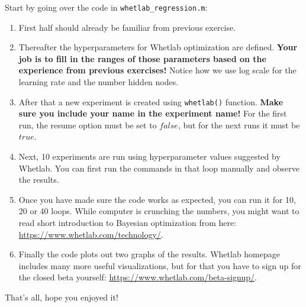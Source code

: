 \documentclass[a4paper,11pt]{article}
\begin{document}
 Start by going over the code in \texttt{whetlab\_regression.m}:

\begin{enumerate}
	\item First half should already be familiar from previous exercise.
	\item Thereafter the hyperparameters for Whetlab optimization are defined. \textbf{Your job is to fill in the ranges of those parameters based on the experience from previous exercises!} Notice how we use log scale for the learning rate and the number hidden nodes.
	\item After that a new experiment is created using \texttt{whetlab()} function. \textbf{Make sure you include your name in the experiment name!} For the first run, the resume option must be set to $false$, but for the next runs it must be $true$.
	\item Next, 10 experiments are run using hyperparameter values suggested by Whetlab. You can first run the commands in that loop manually and observe the results.
	\item Once you have made sure the code works as expected, you can run it for 10, 20 or 40 loops. While computer is crunching the numbers, you might want to read short introduction to Bayesian optimization from here: \url{https://www.whetlab.com/technology/}.
	\item Finally the code plots out two graphs of the results. Whetlab homepage includes many more useful visualizations, but for that you have to sign up for the closed beta yourself: \url{https://www.whetlab.com/beta-signup/}.
\end{enumerate}

That's all, hope you enjoyed it!
\end{document}
